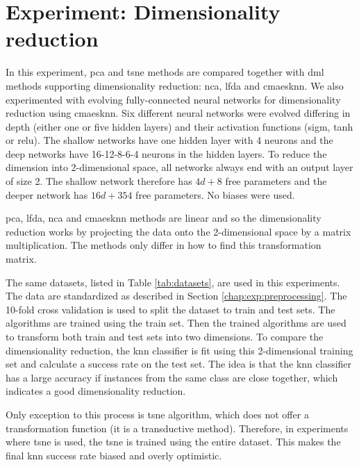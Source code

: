 \documentclass[12pt,a4paper]{report}
\begin{document}


\section{Experiment: Dimensionality reduction} \label{chap:exp:dimred}


In this experiment, \ac{pca} and \ac{tsne} methods are compared together with \ac{dml} methods supporting dimensionality reduction: \ac{nca}, \ac{lfda} and \ac{cmaesknn}. We also experimented with evolving fully-connected neural networks for dimensionality reduction using \ac{cmaesknn}. Six different neural networks were evolved differing in depth (either one or five hidden layers) and their activation functions (\ac{sigm}, \ac{tanh} or \ac{relu}). The shallow networks have one hidden layer with 4 neurons and the deep networks have 16-12-8-6-4 neurons in the hidden layers. To reduce the dimension into 2-dimensional space, all networks always end with an output layer of size 2. The shallow network therefore has $4d+8$ free parameters and the deeper network has $16d+354$ free parameters. No biases were used.

\ac{pca}, \ac{lfda}, \ac{nca} and \ac{cmaesknn} methods are linear and so the dimensionality reduction works by projecting the data onto the 2-dimensional space by a matrix multiplication. The methods only differ in how to find this transformation matrix.

The same datasets, listed in Table \ref{tab:datasets}, are used in this experiments. The data are standardized as described in Section \ref{chap:exp:preprocessing}. The 10-fold cross validation is used to split the dataset to train and test sets. The algorithms are trained using the train set. Then the trained algorithms are used to transform both train and test sets into two dimensions. To compare the dimensionality reduction, the \ac{knn} classifier is fit using this 2-dimensional training set and calculate a success rate on the test set. The idea is that the \ac{knn} classifier has a large accuracy if instances from the same class are close together, which indicates a good dimensionality reduction. 

Only exception to this process is \ac{tsne} algorithm, which does not offer a transformation function (it is a transductive method). Therefore, in experiments where \ac{tsne} is used, the \ac{tsne} is trained using the entire dataset. This makes the final \ac{knn} success rate biased and overly optimistic. %
\end{document}
